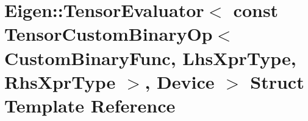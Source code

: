\hypertarget{struct_eigen_1_1_tensor_evaluator_3_01const_01_tensor_custom_binary_op_3_01_custom_binary_func_0fea6836b993af318b6a5ab54d775368f}{}\section{Eigen\+:\+:Tensor\+Evaluator$<$ const Tensor\+Custom\+Binary\+Op$<$ Custom\+Binary\+Func, Lhs\+Xpr\+Type, Rhs\+Xpr\+Type $>$, Device $>$ Struct Template Reference}
\label{struct_eigen_1_1_tensor_evaluator_3_01const_01_tensor_custom_binary_op_3_01_custom_binary_func_0fea6836b993af318b6a5ab54d775368f}
